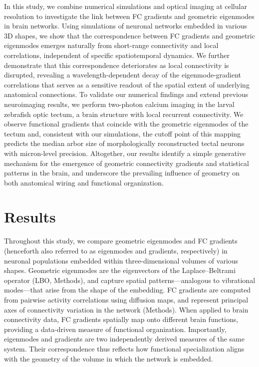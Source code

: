\documentclass{article}
\begin{document}
In this study, we combine numerical simulations and optical imaging at cellular resolution to investigate the link between FC gradients and geometric eigenmodes in brain networks. Using simulations of neuronal networks embedded in various 3D shapes, we show that the correspondence between FC gradients and geometric eigenmodes emerges naturally from short-range connectivity and local correlations, independent of specific spatiotemporal dynamics. We further demonstrate that this correspondence deteriorates as local connectivity is disrupted, revealing a wavelength-dependent decay of the eigenmode-gradient correlations that serves as a sensitive readout of the spatial extent of underlying anatomical connections. To validate our numerical findings and extend previous neuroimaging results\cite{pang2023geometric}, we perform two-photon calcium imaging in the larval zebrafish optic tectum, a brain structure with local recurrent connectivity. We observe functional gradients that coincide with the geometric eigenmodes of the tectum and, consistent with our simulations, the cutoff point of this mapping predicts the median arbor size of morphologically reconstructed tectal neurons with micron-level precision\cite{kunst2019cellular}. Altogether, our results identify a simple generative mechanism for the emergence of geometric connectivity gradients and statistical patterns in the brain, and underscore the prevailing influence of geometry on both anatomical wiring and functional organization.

\section*{Results}

Throughout this study, we compare geometric eigenmodes and FC gradients (henceforth also referred to as eigenmodes and gradients, respectively) in neuronal populations embedded within three-dimensional volumes of various shapes. Geometric eigenmodes are the eigenvectors of the Laplace–Beltrami operator (LBO, Methods), and capture spatial patterns---analogous to vibrational modes---that arise from the shape of the embedding. FC gradients are computed from pairwise activity correlations using diffusion maps\cite{Coifman2006}, and represent principal axes of connectivity variation in the network (Methods). When applied to brain connectivity data, FC gradients spatially map onto different brain functions, providing a data-driven measure of functional organization\cite{margulies2016situating}. Importantly, eigenmodes and gradients are two independently derived measures of the same system. Their correspondence thus reflects how functional specialization aligns with the geometry of the volume in which the network is embedded.
\end{document}
